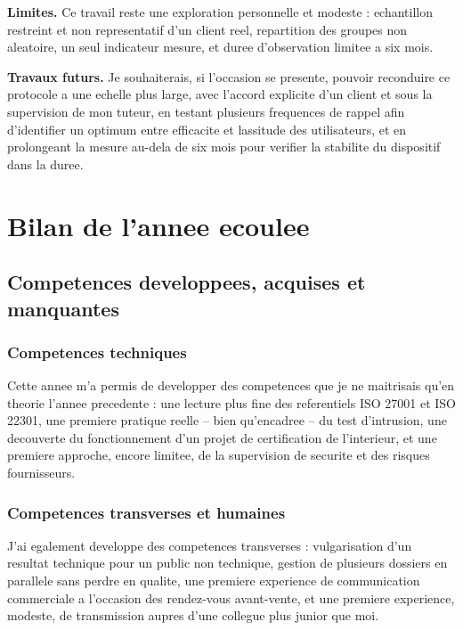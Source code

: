 \documentclass[11pt,a4paper]{article}
\begin{document}
\textbf{Limites.} Ce travail reste une exploration personnelle et modeste : echantillon restreint et non representatif d'un client reel, repartition des groupes non aleatoire, un seul indicateur mesure, et duree d'observation limitee a six mois.

\textbf{Travaux futurs.} Je souhaiterais, si l'occasion se presente, pouvoir reconduire ce protocole a une echelle plus large, avec l'accord explicite d'un client et sous la supervision de mon tuteur, en testant plusieurs frequences de rappel afin d'identifier un optimum entre efficacite et lassitude des utilisateurs, et en prolongeant la mesure au-dela de six mois pour verifier la stabilite du dispositif dans la duree.

\newpage
\section{Bilan de l'annee ecoulee}

\subsection{Competences developpees, acquises et manquantes}

\subsubsection*{Competences techniques}

Cette annee m'a permis de developper des competences que je ne maitrisais qu'en theorie l'annee precedente : une lecture plus fine des referentiels ISO 27001 et ISO 22301, une premiere pratique reelle -- bien qu'encadree -- du test d'intrusion, une decouverte du fonctionnement d'un projet de certification de l'interieur, et une premiere approche, encore limitee, de la supervision de securite et des risques fournisseurs.

\subsubsection*{Competences transverses et humaines}

J'ai egalement developpe des competences transverses : vulgarisation d'un resultat technique pour un public non technique, gestion de plusieurs dossiers en parallele sans perdre en qualite, une premiere experience de communication commerciale a l'occasion des rendez-vous avant-vente, et une premiere experience, modeste, de transmission aupres d'une collegue plus junior que moi.
\end{document}
